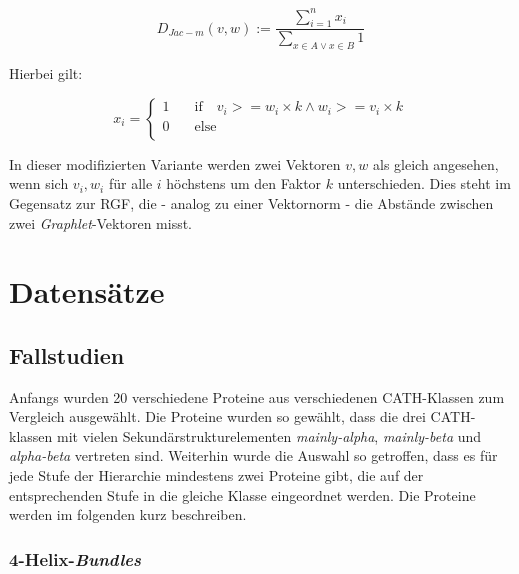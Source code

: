 \documentclass{report}
\begin{document}
\[ D_{Jac-m}(v,w) := \frac{\sum_{i = 1}^n x_i}{\sum_{x \in A \lor x \in B} 1} \]

Hierbei gilt:

\[ x_i = 
   \begin{cases}
     1     & \quad \mathrm{if} \quad v_i >= w_i \times k \land w_i >= v_i \times k \\
     0     & \quad \mathrm{else} \\
   \end{cases}
\]

In dieser modifizierten Variante werden zwei Vektoren $v,w$ als gleich angesehen, wenn sich $v_i,w_i$ f\"ur alle $i$ h\"ochstens um den Faktor $k$ unterschieden.
Dies steht im Gegensatz zur RGF, die - analog zu einer Vektornorm - die Abst\"ande zwischen zwei \textit{Graphlet}-Vektoren misst.



\section{Datens\"atze}


\subsection{Fallstudien}

Anfangs wurden 20 verschiedene Proteine aus verschiedenen CATH-Klassen zum Vergleich ausgew\"ahlt. Die Proteine wurden so gew\"ahlt, dass die drei CATH-klassen mit vielen Sekund\"arstrukturelementen \textit{mainly-alpha}, \textit{mainly-beta} und \textit{alpha-beta} vertreten sind. Weiterhin wurde die Auswahl so getroffen, dass es f\"ur jede Stufe der Hierarchie mindestens zwei Proteine gibt, die auf der entsprechenden Stufe in die gleiche Klasse eingeordnet werden. Die Proteine werden im folgenden kurz beschreiben.


\subsubsection{4-Helix-\textit{Bundles}}
\end{document}
